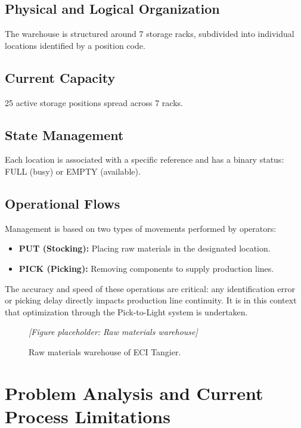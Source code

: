 \subsection{Physical and Logical Organization}

The warehouse is structured around 7 storage racks, subdivided into individual locations identified by a position code.

\subsection{Current Capacity}

25 active storage positions spread across 7 racks.

\subsection{State Management}

Each location is associated with a specific reference and has a binary status: FULL (busy) or EMPTY (available).

\subsection{Operational Flows}

Management is based on two types of movements performed by operators:

\begin{itemize}
  \item \textbf{PUT (Stocking):} Placing raw materials in the designated location.
  \item \textbf{PICK (Picking):} Removing components to supply production lines.
\end{itemize}

The accuracy and speed of these operations are critical: any identification error or picking delay directly impacts production line continuity. It is in this context that optimization through the Pick-to-Light system is undertaken.

\begin{figure}[H]
  \centering
  \textit{[Figure placeholder: Raw materials warehouse]}
  \caption{Raw materials warehouse of ECI Tangier.}
  \label{fig:warehouse}
\end{figure}

\section{Problem Analysis and Current Process Limitations}
\label{sec:problem-analysis}

